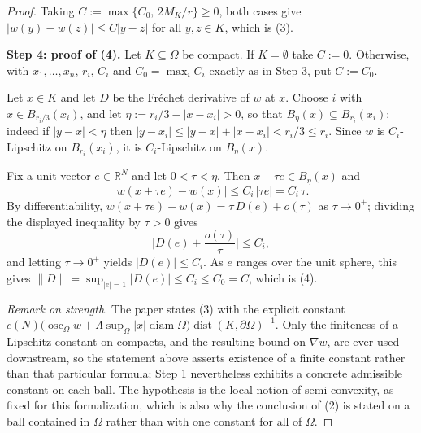 \begin{proof}
Taking $C:=\max\{C_0,\,2M_K/r\}\ge0$, both cases give $|w(y)-w(z)|\le C|y-z|$ for all
$y,z\in K$, which is (3).

\medskip\noindent\textbf{Step 4: proof of (4).} Let $K\subseteq\Omega$ be compact. If
$K=\emptyset$ take $C:=0$. Otherwise, with $x_1,\ldots,x_n$, $r_i$, $C_i$ and
$C_0=\max_i C_i$ exactly as in Step 3, put $C:=C_0$.

Let $x\in K$ and let $D$ be the Fr\'echet derivative of $w$ at $x$. Choose $i$ with
$x\in B_{r_i/3}(x_i)$, and let $\eta:=r_i/3-|x-x_i|>0$, so that
$B_\eta(x)\subseteq B_{r_i}(x_i)$: indeed if $|y-x|<\eta$ then
$|y-x_i|\le|y-x|+|x-x_i|<r_i/3\le r_i$. Since $w$ is $C_i$-Lipschitz on $B_{r_i}(x_i)$, it is
$C_i$-Lipschitz on $B_\eta(x)$.

Fix a unit vector $e\in\mathbb R^{N}$ and let $0<\tau<\eta$. Then $x+\tau e\in B_\eta(x)$ and
\[
 \big|w(x+\tau e)-w(x)\big|\le C_i\,|\tau e|=C_i\,\tau .
\]
By differentiability, $w(x+\tau e)-w(x)=\tau\,D(e)+o(\tau)$ as $\tau\to0^{+}$; dividing the
displayed inequality by $\tau>0$ gives
\[
 \Big|D(e)+\frac{o(\tau)}{\tau}\Big|\le C_i ,
\]
and letting $\tau\to0^{+}$ yields $|D(e)|\le C_i$. As $e$ ranges over the unit sphere, this
gives $\|D\|=\sup_{|e|=1}|D(e)|\le C_i\le C_0=C$, which is (4).

\medskip\noindent\emph{Remark on strength.} The paper states (3) with the explicit constant
$c(N)\big(\operatorname{osc}_\Omega w+\Lambda\sup_\Omega|x|\operatorname{diam}\Omega\big)
\operatorname{dist}(K,\partial\Omega)^{-1}$. Only the finiteness of a Lipschitz constant on
compacts, and the resulting bound on $\nabla w$, are ever used downstream, so the statement
above asserts existence of a finite constant rather than that particular formula; Step 1
nevertheless exhibits a concrete admissible constant on each ball. The hypothesis is the
local notion of semi-convexity, as fixed for this formalization, which is also why the
conclusion of (2) is stated on a ball contained in $\Omega$ rather than with one constant
for all of $\Omega$.
\end{proof}
